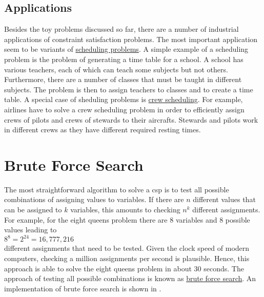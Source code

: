 \subsection{Applications}
Besides the toy problems discussed so far, there are a number of industrial applications of constraint
satisfaction problems.  The most important application seem to be variants of
\href{https://en.wikipedia.org/wiki/Scheduling_(production_processes)}{scheduling problems}. 
A simple example of a scheduling problem is the problem of generating a time table for a school.  A school has
various teachers, each of which can teach some subjects but not others.  Furthermore, there are a number of
classes that must be taught in different subjects.  The problem is then to assign teachers to classes and to
create a time table.  A special case of sheduling problems is
\href{https://en.wikipedia.org/wiki/Crew_scheduling}{crew scheduling}.  For example, airlines have to solve a
crew scheduling problem in order to efficiently assign crews of pilots and crews of stewards to their
aircrafts.  Stewards and pilots work in different crews as they have different required resting times.

\section{Brute Force Search}
The most straightforward algorithm to solve a \ac{csp} is to test all possible combinations of assigning
values to variables.  If there are $n$ different values that can be assigned to $k$ variables, this amounts to 
checking $n^k$ different assignments.  For example, for the eight queens problem there are 8 variables and
8 possible values leading to 
\\[0.2cm]
\hspace*{1.3cm}
$8^8 = 2^{24} = 16,777,216$
\\[0.2cm]
different assignments that need to be tested.  Given the clock speed of modern computers, checking a million
assignments per second is plausible.  Hence, this approach is able to solve the eight queens problem in
about 30 seconds.  The approach of testing all possible combinations is known as
\href{https://en.wikipedia.org/wiki/Brute-force_search}{brute force search}.  
An implementation of brute force search is shown in . 

